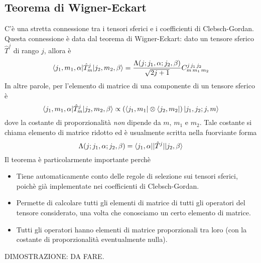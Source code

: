 \documentclass[a4paper, 11pt]{article}
\newcommand{\op}{\hat}
\newcommand{\1}{\mathbbm{1}}
\begin{document}
	\subsection{Teorema di Wigner-Eckart}
	C'è una stretta connessione tra i tensori sferici e i coefficienti di Clebsch-Gordan. Questa connessione è data dal teorema di Wigner-Eckart: dato un tensore sferico $\op T^{j}$ di rango $j$, allora è
	\[\braketop{j_1,m_1,\alpha}{\op T^j_m}{j_2,m_2,\beta}=\frac{\Lambda(j;j_1,\alpha;j_2,\beta)}{\sqrt{2j+1}}\tensor*{C}{^{j\,j_1\,j_2}_{m\,m_1\,m_2}}\]
	In altre parole, per l'elemento di matrice di una componente di un tensore sferico è
	\[\braketop{j_1,m_1,\alpha}{\op T^j_m}{j_2,m_2,\beta}\propto(\bra{j_1,m_1}\otimes\bra{j_2,m_2})\ket{j_1,j_2;j,m}\]
	dove la costante di proporzionalità \emph{non} dipende da $m$, $m_1$ e $m_2$. Tale costante si chiama elemento di matrice ridotto ed è usualmente scritta nella fuorviante forma
	\[\Lambda(j;j_1,\alpha;j_2,\beta)=\braketop{j_1,\alpha}{|\op T^j|}{j_2,\beta}\]
	Il teorema è particolarmente importante perchè
	\begin{itemize}
		\item Tiene automaticamente conto delle regole di selezione sui tensori sferici, poichè già implementate nei coefficienti di Clebsch-Gordan.
		\item Permette di calcolare tutti gli elementi di matrice di tutti gli operatori del tensore considerato, una volta che conosciamo un certo elemento di matrice.
		\item Tutti gli operatori hanno elementi di matrice proporzionali tra loro (con la costante di proporzionalità eventualmente nulla).
	\end{itemize}
	DIMOSTRAZIONE: DA FARE.
\end{document}
